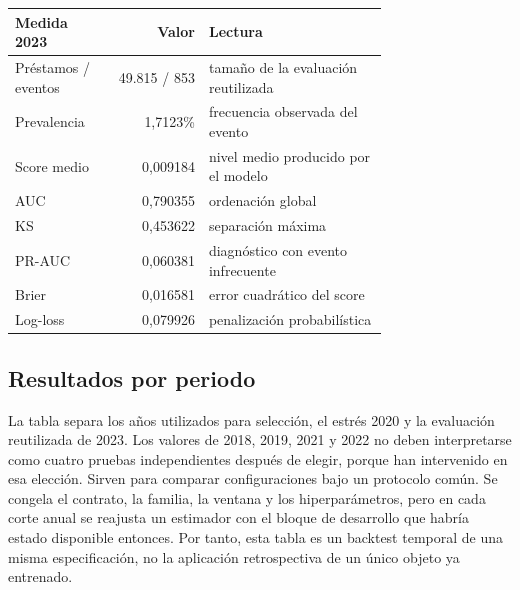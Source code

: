 \documentclass[10pt,a4paper]{article}
\newcommand{\FinalAUC}{0,790355}
\newcommand{\FinalKS}{0,453622}
\newcommand{\FinalPRAUC}{0,060381}
\newcommand{\FinalBrier}{0,016581}
\newcommand{\FinalLogLoss}{0,079926}
\newcommand{\FinalN}{49.815}
\newcommand{\FinalEvents}{853}
\newcommand{\FinalPrevalence}{1,7123\%}
\newcommand{\FinalMeanScore}{0,009184}
\begin{document}
\begin{center}\small
\begin{tabular}{p{0.26\linewidth} r p{0.48\linewidth}}
\textbf{Medida 2023} & \textbf{Valor} & \textbf{Lectura}\\ \hline
Préstamos / eventos & \FinalN{} / \FinalEvents{} & tamaño de la evaluación reutilizada\\
Prevalencia & \FinalPrevalence{} & frecuencia observada del evento\\
Score medio & \FinalMeanScore{} & nivel medio producido por el modelo\\
AUC & \FinalAUC{} & ordenación global\\
KS & \FinalKS{} & separación máxima\\
PR-AUC & \FinalPRAUC{} & diagnóstico con evento infrecuente\\
Brier & \FinalBrier{} & error cuadrático del score\\
Log-loss & \FinalLogLoss{} & penalización probabilística\\
\end{tabular}
\end{center}

\subsection{Resultados por periodo}

La tabla separa los años utilizados para selección, el estrés 2020 y la
evaluación reutilizada de 2023. Los valores de 2018, 2019, 2021 y 2022 no deben
interpretarse como cuatro pruebas independientes después de elegir, porque han
intervenido en esa elección. Sirven para comparar configuraciones bajo un
protocolo común. Se congela el contrato, la familia, la ventana y los
hiperparámetros, pero en cada corte anual se reajusta un estimador con el bloque
de desarrollo que habría estado disponible entonces. Por tanto, esta tabla es
un backtest temporal de una misma especificación, no la aplicación retrospectiva
de un único objeto ya entrenado.
\end{document}
